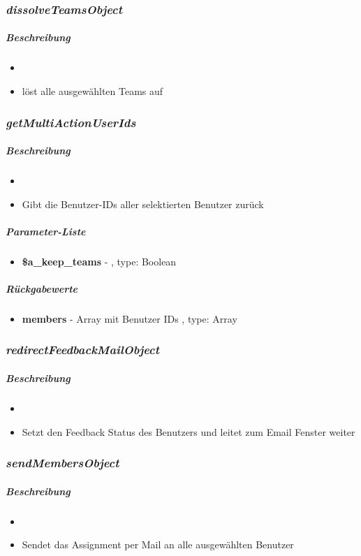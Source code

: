 \subsubsection*{\textit{dissolveTeamsObject}}\label{dissolveTeamsObjectTGUI}
\subparagraph{Beschreibung}
\begin{itemize}
	\item[] \noindent{}
	\item[] löst alle ausgewählten Teams auf
\end{itemize}

\subsubsection*{\textit{getMultiActionUserIds}}\label{getMultiActionUserIdsTGUI}
\subparagraph{Beschreibung}
\begin{itemize}
	\item[] \noindent{}
	\item[] Gibt die Benutzer-IDs aller selektierten Benutzer zurück
\end{itemize}
\subparagraph{Parameter-Liste}
\begin{itemize}
	\item[] \textbf{\$a\_keep\_teams} - , type: Boolean
\end{itemize}
\subparagraph{Rückgabewerte}
\begin{itemize}
	\item[] \textbf{members} - Array mit Benutzer IDs , type: Array
\end{itemize}

\subsubsection*{\textit{redirectFeedbackMailObject}}\label{redirectFeedbackMailObjectTGUI}
\subparagraph{Beschreibung}
\begin{itemize}
	\item[] \noindent{}
	\item[]  Setzt den Feedback Status des Benutzers und leitet zum Email Fenster weiter
\end{itemize}

\subsubsection*{\textit{sendMembersObject}}\label{sendMembersObjectTGUI}
\subparagraph{Beschreibung}
\begin{itemize}
	\item[] \noindent{}
	\item[]  Sendet das Assignment per Mail an alle ausgewählten Benutzer
\end{itemize}

